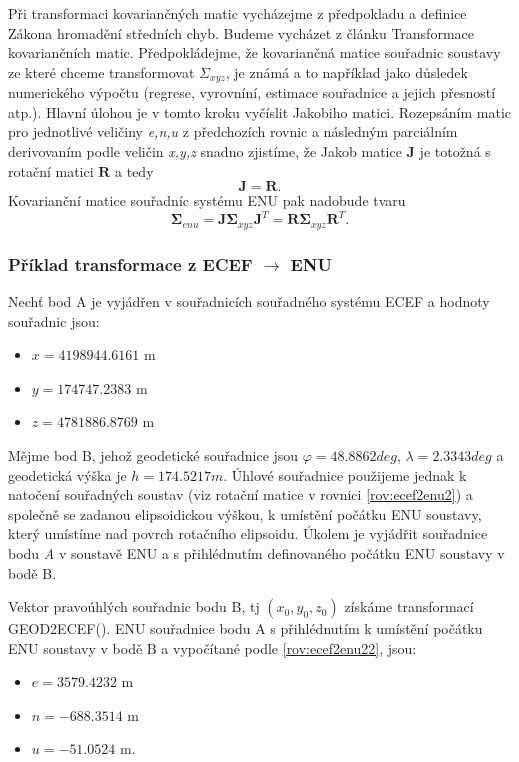 \documentclass[11pt,a4paper]{article}
\begin{document}
Při transformaci kovariančných matic vycházejme z předpokladu a definice Zákona hromadění středních chyb. Budeme vycházet z článku Transformace kovariančních matic. Předpokládejme, že kovariančná matice souřadnic soustavy ze které chceme transformovat $\Sigma_{xyz}$, je známá a to například jako důsledek numerického výpočtu (regrese, vyrovníní, estimace souřadnice a jejich přesností atp.). Hlavní úlohou je v tomto kroku vyčíslit Jakobiho matici. Rozepsáním matic pro jednotlivé veličiny \textit{e,n,u} z předchozích rovnic a následným parciálním derivovaním podle veličin \textit{x,y,z} snadno zjistíme, že Jakob matice $\mathbf{J}$ je totožná s rotační matici $\mathbf{R}$ a tedy
\begin{equation}
\mathbf{J} = \mathbf{R}.
\end{equation}
Kovarianční matice souřadníc systému ENU pak nadobude tvaru
\begin{equation}
\mathbf{\Sigma}_{enu} = \mathbf{J}\mathbf{\Sigma}_{xyz}\mathbf{J}^{T} = \mathbf{R}\mathbf{\Sigma}_{xyz}\mathbf{R}^{T}.
\end{equation}

\subsubsection{Příklad transformace z ECEF $\rightarrow$ ENU}

Nechť bod A je vyjádřen v souřadnicích souřadného systému ECEF a hodnoty souřadnic jsou:
\begin{itemize}
\item $x = 4198944.6161$ m
\item $y = 174747.2383$ m
\item $z = 4781886.8769$ m
\end{itemize}

Mějme bod B, jehož geodetické souřadnice jsou $ \varphi = 48.8862 deg$, $\lambda = 2.3343 deg$ a geodetická výška je $ h = 174.5217 m $. Úhlové souřadnice použijeme jednak k natočení souřadných soustav (viz rotační matice v rovnici \ref{rov:ecef2enu2}) a společně se zadanou elipsoidickou výškou, k umístění počátku ENU soustavy, který umístíme nad povrch rotačního elipsoidu. Úkolem je vyjádřit souřadnice bodu \textit{A} v soustavě ENU a s přihlédnutím definovaného počátku ENU soustavy v bodě B.

Vektor pravoúhlých souřadnic bodu B, tj $ \left(x_{0}, y_{0}, z_{0} \right)$ získáme transformací GEOD2ECEF(). ENU souřadnice bodu A s přihlédnutím k umístění počátku ENU soustavy v bodě B a vypočítané podle \ref{rov:ecef2enu22}, jsou:
\begin{itemize}
\item $e = 3579.4232 $ m
\item $n = -688.3514 $ m
\item $u = -51.0524 $ m.
\end{itemize}
\end{document}
